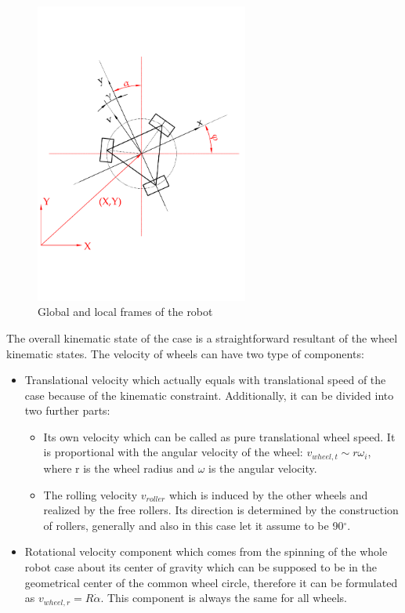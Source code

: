 \documentclass[12pt,english]{article}
\begin{document}
\begin{figure}[htb!]
	\centering
	\includegraphics[width=7cm]{figures/global_local_frame}
	\caption{Global and local frames of the robot}
	\label{global_local_frame}
\end{figure}
The overall kinematic state of the case is a straightforward resultant of the wheel kinematic states. The velocity of wheels can have two type of components:
\begin{itemize}
	\item Translational velocity which actually equals with translational speed of the case because of the kinematic constraint. Additionally, it can be divided into two further parts:
		\begin{itemize}
			\item Its own velocity which can be called as pure translational wheel speed. It is proportional with the angular velocity of the wheel: $v_{wheel,t} \sim r \omega_i$, where r is the wheel radius and $\omega$ is the angular velocity.
			\item The rolling velocity $v_{roller}$ which is induced by the other wheels and realized by the free rollers. Its direction is determined by the construction of rollers, generally and also in this case let it assume to be 90$^{\circ}$.
		\end{itemize}
	\item Rotational velocity component which comes from the spinning of the whole robot case about its center of gravity which can be supposed to be in the geometrical center of the common wheel circle, therefore it can be formulated as $v_{wheel,r}  = R \dot \alpha$. This component is always the same for all wheels.
\end{itemize}
\end{document}
